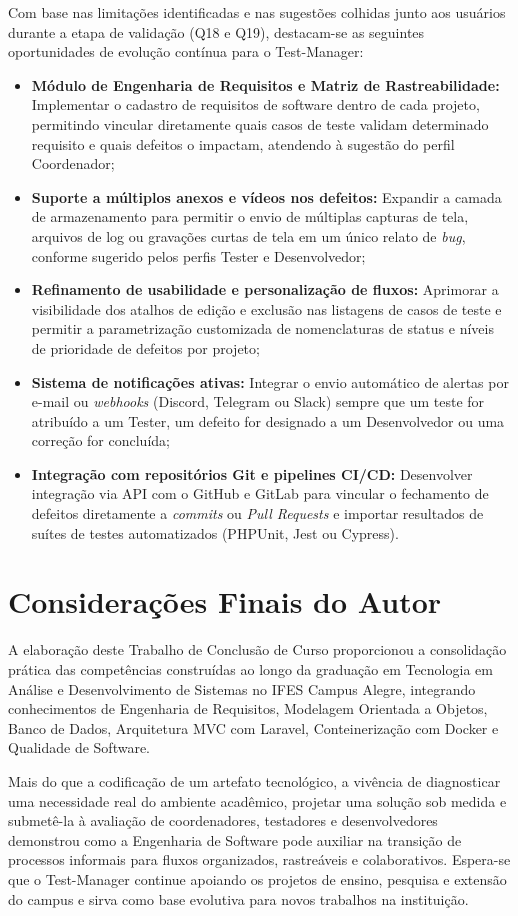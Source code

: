 Com base nas limitações identificadas e nas sugestões colhidas junto aos usuários durante a etapa de validação (Q18 e Q19), destacam-se as seguintes oportunidades de evolução contínua para o Test-Manager:
\begin{itemize}
    \item \textbf{Módulo de Engenharia de Requisitos e Matriz de Rastreabilidade:} Implementar o cadastro de requisitos de software dentro de cada projeto, permitindo vincular diretamente quais casos de teste validam determinado requisito e quais defeitos o impactam, atendendo à sugestão do perfil Coordenador;
    \item \textbf{Suporte a múltiplos anexos e vídeos nos defeitos:} Expandir a camada de armazenamento para permitir o envio de múltiplas capturas de tela, arquivos de log ou gravações curtas de tela em um único relato de \textit{bug}, conforme sugerido pelos perfis Tester e Desenvolvedor;
    \item \textbf{Refinamento de usabilidade e personalização de fluxos:} Aprimorar a visibilidade dos atalhos de edição e exclusão nas listagens de casos de teste e permitir a parametrização customizada de nomenclaturas de status e níveis de prioridade de defeitos por projeto;
    \item \textbf{Sistema de notificações ativas:} Integrar o envio automático de alertas por e-mail ou \textit{webhooks} (Discord, Telegram ou Slack) sempre que um teste for atribuído a um Tester, um defeito for designado a um Desenvolvedor ou uma correção for concluída;
    \item \textbf{Integração com repositórios Git e pipelines CI/CD:} Desenvolver integração via API com o GitHub e GitLab para vincular o fechamento de defeitos diretamente a \textit{commits} ou \textit{Pull Requests} e importar resultados de suítes de testes automatizados (PHPUnit, Jest ou Cypress).
\end{itemize}

\section{Considerações Finais do Autor}

A elaboração deste Trabalho de Conclusão de Curso proporcionou a consolidação prática das competências construídas ao longo da graduação em Tecnologia em Análise e Desenvolvimento de Sistemas no IFES Campus Alegre, integrando conhecimentos de Engenharia de Requisitos, Modelagem Orientada a Objetos, Banco de Dados, Arquitetura MVC com Laravel, Conteinerização com Docker e Qualidade de Software.

Mais do que a codificação de um artefato tecnológico, a vivência de diagnosticar uma necessidade real do ambiente acadêmico, projetar uma solução sob medida e submetê-la à avaliação de coordenadores, testadores e desenvolvedores demonstrou como a Engenharia de Software pode auxiliar na transição de processos informais para fluxos organizados, rastreáveis e colaborativos. Espera-se que o Test-Manager continue apoiando os projetos de ensino, pesquisa e extensão do campus e sirva como base evolutiva para novos trabalhos na instituição.